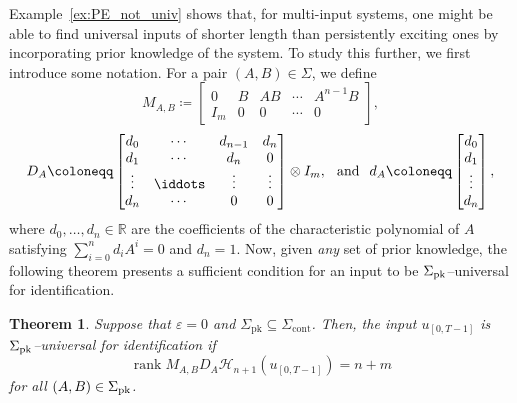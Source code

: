 \documentclass[journal,twoside,web]{ieeecolor}
\DeclareMathOperator{\rank}{rank}
\newtheorem{theorem}{Theorem}
\begin{document}
Example~\ref{ex:PE_not_univ} shows that, for multi-input systems, one might be able to find universal inputs of shorter length than persistently exciting ones by incorporating prior knowledge of the system. To study this further, we first introduce some notation. For a pair $(A,B)\in\Sigma$, we define
\begin{equation}
M_{A,B}\coloneqq \begin{bmatrix}
0 & B & AB & \cdots & A^{n-1} B \\
I_m & 0 & 0 & \cdots & 0
\end{bmatrix}, 
\end{equation}
\begin{equation}
D_A\coloneqq \begin{bmatrix}
d_0 & \cdots & d_{n-1} & d_n \\
d_1 & \cdots & d_n & 0 \\
\vdots & \iddots & \vdots & \vdots \\
d_n & \cdots & 0 & 0
\end{bmatrix}\otimes I_m, \hspace{0.25 cm} \textup{and} \hspace{0.25 cm} d_A\coloneqq \begin{bmatrix}
d_0 \\ d_1 \\ \vdots \\ d_n
\end{bmatrix},
\end{equation}
where $d_0,\ldots,d_{n}\in\mathbb{R}$ are the coefficients of the characteristic polynomial of $A$ satisfying $\sum_{i=0}^n d_iA^i=0$ and $d_n=1$. Now, given \emph{any} set of prior knowledge, the following theorem presents a sufficient condition for an input to be $\Sigma_\textup{pk}$--universal for identification. 

\begin{theorem}
\label{th:GM_noiseless}
Suppose that $\varepsilon=0$ and $\Sigma_\text{pk}\subseteq\Sigma_\text{cont}$. Then, the input $u_{[0,T-1]}$ is $\Sigma_\textup{pk}$--universal for identification if 
\begin{equation}
\label{eq:th:GM_noiseless-1}
\rank M_{A,B}D_A\mathcal{H}_{n+1}(u_{[0,T-1]}) = n+m
\end{equation}
for all $(A,B)\in\Sigma_\textup{pk}$.  
\end{theorem}
\end{document}

